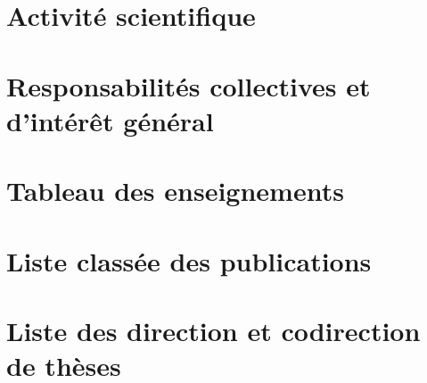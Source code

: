 \documentclass[12pt, a4paper, french]{article}
\begin{document}
\section{Activité scientifique \label{sec:rech} } 


\section{Responsabilités collectives et d’intérêt général \label{sec:col} } 


% 

\appendix \newpage

\section{Tableau des enseignements \label{app:ens}}


\section{Liste classée des publications \label{app:pub}}


\section{Liste des direction et codirection de thèses \label{app:phd}}


% 
% 

\end{document}
